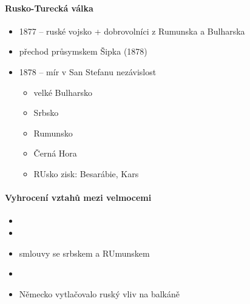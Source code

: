 \paragraph{Rusko-Turecká válka}
\begin{itemize}
\item 1877 -- ruské vojsko + dobrovolníci z Rumunska a Bulharska
\item přechod průsymskem Šipka (1878)
\item 1878 -- mír v San Stefanu \ra nezávislost
	\begin{itemize}
	\item velké Bulharsko
	\item Srbsko
	\item Rumunsko
	\item Černá Hora
	\item RUsko zisk: Besarábie, Kars
	\end{itemize}
\end{itemize}

\paragraph{Vyhrocení vztahů mezi velmocemi}
\begin{itemize}
\item {}
\item {}
\item smlouvy se srbskem a RUmunskem
\item {}
\item Německo vytlačovalo ruský vliv na balkáně 
\end{itemize}

